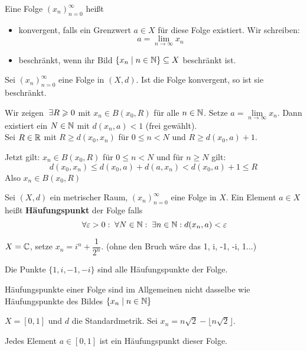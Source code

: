 \documentclass[main.tex]{subfiles}
\begin{document}
\begin{Definition}
  Eine Folge $(x_n)_{n=0}^\infty$ heißt
  \begin{itemize}
    \item konvergent, falls ein Grenzwert $a \in X$ für diese Folge existiert. Wir schreiben:
        $$a = \lim \limits_{n \to \infty} x_n$$
    \item beschränkt, wenn ihr Bild $\{x_n \mid n \in \mathbb{N}\}\subseteq X$ beschränkt ist.
  \end{itemize}
\end{Definition}

\begin{Theorem}
  Sei $(x_n)_{n=0}^\infty$ eine Folge in $(X,d)$. Ist die Folge konvergent, so ist sie beschränkt.
\end{Theorem}

\begin{Beweis}
  Wir zeigen $\;\exists R \geqslant 0$ mit $x_n \in B(x_0,R)$ für alle $n \in \mathbb{N}$. Setze $a = \lim \limits_{n \to \infty} x_n$. Dann existiert ein $N \in \mathbb{N}$ mit $d(x_n,a) < 1$ (frei gewählt).\\
  Sei $R \in \mathbb{R}$ mit $R\geq d(x_0,x_n)$ für $0 \leq n < N$ und $R \geq d(x_0,a)+1$.

  Jetzt gilt: $x_n \in B(x_0,R)$ für $0 \leq n < N$ und für $n \geq N$ gilt:
  $$d(x_0,x_n) \leq d(x_0,a) + d(a,x_n) < d(x_0,a)+ 1 \leq R$$
  Also $x_n \in B(x_0,R)$
\end{Beweis}

\begin{Definition}[Häufungspunkt]
  Sei $(X,d)$ ein metrischer Raum, $(x_n)_{n=0}^\infty$ eine Folge in $X$. Ein Element $a \in X$ heißt \textbf{Häufungspunkt} der Folge falls
  $$\;\forall \varepsilon > 0 : \;\forall N \in \mathbb{N}: \;\exists n \in \mathbb{N} : d(x_n,a) < \varepsilon$$
\end{Definition}

\begin{Beispiel}
  $X = \mathbb{C}$, setze $x_n = i^n + \dfrac{1}{2^n}$. (ohne den Bruch wäre das 1, i, -1, -i, 1...)

  Die Punkte $\{1,i,-1,-i\}$ sind alle Häufungspunkte der Folge.
\end{Beispiel}

\begin{Bemerkung}[Warnung]
  Häufungspunkte einer Folge sind im Allgemeinen nicht dasselbe wie Häufungspunkte des Bildes $\{x_n \mid n \in \mathbb{N}\}$
\end{Bemerkung}

\begin{Beispiel}
  $X = [0,1]$ und $d$ die Standardmetrik. Sei $x_n = n \sqrt{2} - \lfloor n \sqrt{2} \rfloor$.
  \begin{Theorem}
    Jedes Element $a \in [0,1]$ ist ein Häufungspunkt dieser Folge.
  \end{Theorem}
\end{Beispiel}
\end{document}
